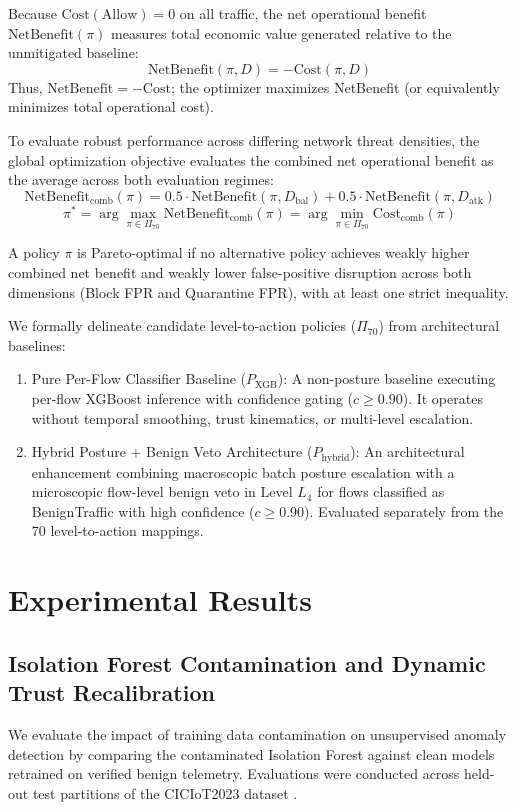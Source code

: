 \documentclass[journal,10pt,onecolumn]{IEEEtran}
\begin{document}
Because $\text{Cost}(\text{Allow}) = 0$ on all traffic, the net operational benefit $\text{NetBenefit}(\pi)$ measures total economic value generated relative to the unmitigated baseline:
$$\text{NetBenefit}(\pi, D) = -\text{Cost}(\pi, D)$$
Thus, $\text{NetBenefit} = -\text{Cost}$; the optimizer maximizes NetBenefit (or equivalently minimizes total operational cost).

To evaluate robust performance across differing network threat densities, the global optimization objective evaluates the combined net operational benefit as the average across both evaluation regimes:
$$\text{NetBenefit}_{\text{comb}}(\pi) = 0.5 \cdot \text{NetBenefit}(\pi, D_{\text{bal}}) + 0.5 \cdot \text{NetBenefit}(\pi, D_{\text{atk}})$$
$$\pi^* = \arg\max_{\pi \in \Pi_{70}} \text{NetBenefit}_{\text{comb}}(\pi) = \arg\min_{\pi \in \Pi_{70}} \text{Cost}_{\text{comb}}(\pi)$$

A policy $\pi$ is Pareto-optimal if no alternative policy achieves weakly higher combined net benefit and weakly lower false-positive disruption across both dimensions (Block FPR and Quarantine FPR), with at least one strict inequality.

We formally delineate candidate level-to-action policies ($\Pi_{70}$) from architectural baselines:
\begin{enumerate}
  \item Pure Per-Flow Classifier Baseline ($P_{\text{XGB}}$): A non-posture baseline executing per-flow XGBoost inference with confidence gating ($c \ge 0.90$). It operates without temporal smoothing, trust kinematics, or multi-level escalation.
  \item Hybrid Posture + Benign Veto Architecture ($P_{\text{hybrid}}$): An architectural enhancement combining macroscopic batch posture escalation with a microscopic flow-level benign veto in Level $L_4$ for flows classified as BenignTraffic with high confidence ($c \ge 0.90$). Evaluated separately from the 70 level-to-action mappings.
\end{enumerate}






\section{Experimental Results}

\subsection{Isolation Forest Contamination and Dynamic Trust Recalibration}
We evaluate the impact of training data contamination on unsupervised anomaly detection by comparing the contaminated Isolation Forest against clean models retrained on verified benign telemetry. Evaluations were conducted across held-out test partitions of the CICIoT2023 dataset \cite{3}.
\end{document}
